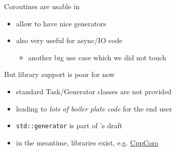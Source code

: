 \begin{frame}[fragile]
  \begin{exampleblock}{Coroutines are usable in }
    \begin{itemize}
    \item allow to have nice generators
    \item also very useful for async/IO code
      \begin{itemize}
      \item another big use case which we did not touch
      \end{itemize}
    \end{itemize}
  \end{exampleblock}
  \begin{alertblock}{But library support is poor for now}
    \begin{itemize}
    \item standard Task/Generator classes are not provided
    \item leading to \emph{lots of boiler plate code} for the end user
    \item \texttt{std::generator} is part of 's draft
    \item in the meantime, libraries exist, e.g. \href{https://github.com/lewissbaker/cppcoro}{CppCoro}
    \end{itemize}
  \end{alertblock}
\end{frame}
